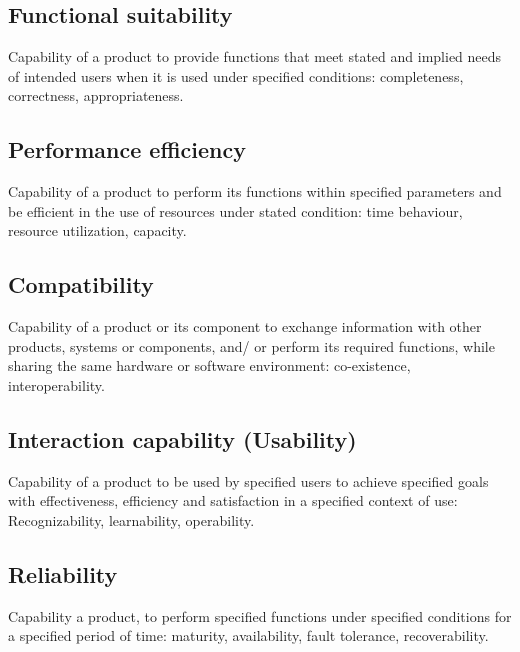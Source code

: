 \begin{center}
  \begin{minipage}[t]{0.49\linewidth}
    \vspace{0pt}

    \subsection{Functional suitability}
    Capability of a product to provide functions that meet stated
    and implied needs of intended users when it is used under
    specified conditions: completeness, correctness, appropriateness.

    \subsection{Performance efficiency}
    Capability of a product to perform its functions within specified
    parameters and be efficient in the use of resources under
    stated condition: time behaviour, resource utilization, capacity.

    \subsection{Compatibility}
    Capability of a product or its component to exchange
    information with other products, systems or components, and/
    or perform its required functions, while sharing the same
    hardware or software environment: co-existence, interoperability.

    \subsection{Interaction capability (Usability)}
    Capability of a product to be used by specified users to achieve
    specified goals with effectiveness, efficiency and satisfaction in
    a specified context of use: Recognizability, learnability, operability.

  \end{minipage}%
  \hfill%
  \begin{minipage}[t]{0.49\linewidth}
    \vspace{0pt}

    \subsection{Reliability}
    Capability a product, to perform specified functions under
    specified conditions for a specified period of time: maturity,
    availability, fault tolerance, recoverability.


\end{minipage}
\end{center}
